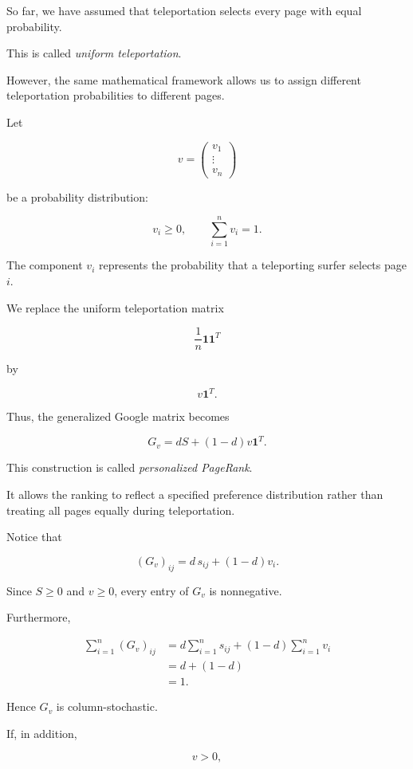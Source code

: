 \documentclass[11pt,a4paper]{article}
\theoremstyle{definition}
\theoremstyle{remark}
\begin{document}
So far, we have assumed
that teleportation selects
every page with equal
probability.

This is called
\emph{uniform teleportation}.

However, the same
mathematical framework
allows us to assign
different teleportation
probabilities to
different pages.

Let

\[
v=
\begin{pmatrix}
v_1\\
\vdots\\
v_n
\end{pmatrix}
\]

be a probability distribution:

\[
v_i\geq0,
\qquad
\sum_{i=1}^{n}v_i=1.
\]

The component $v_i$
represents the probability
that a teleporting surfer
selects page $i$.

We replace the uniform
teleportation matrix

\[
\frac1n\mathbf{1}\mathbf{1}^T
\]

by

\[
v\mathbf{1}^T.
\]

Thus, the generalized
Google matrix becomes

\begin{equation}
\boxed{
G_v=
dS+(1-d)v\mathbf{1}^T.
}
\label{eq:personalized_google_matrix}
\end{equation}

This construction is
called \emph{personalized PageRank}.

It allows the ranking
to reflect a specified
preference distribution
rather than treating
all pages equally
during teleportation.

Notice that

\[
(G_v)_{ij}
=
d\,s_{ij}+(1-d)v_i.
\]

Since $S\geq0$
and $v\geq0$,
every entry of
$G_v$ is nonnegative.

Furthermore,

\[
\begin{aligned}
\sum_{i=1}^{n}(G_v)_{ij}
&=
d\sum_{i=1}^{n}s_{ij}
+
(1-d)\sum_{i=1}^{n}v_i\\
&=
d+(1-d)\\
&=1.
\end{aligned}
\]

Hence $G_v$
is column-stochastic.

If, in addition,

\[
v>0,
\]
\end{document}
